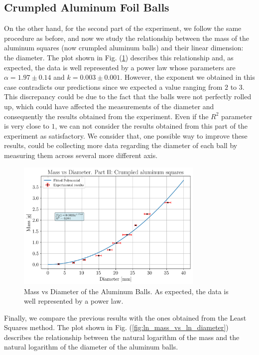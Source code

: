 \documentclass[a4paper,12pt]{article}
\begin{document}
\subsection{Crumpled Aluminum Foil Balls}
On the other hand, for the second part of the experiment, we follow the same procedure as before, and now we study the relationship between the mass 
of the aluminum squares (now crumpled aluminum balls) and their linear dimension: the diameter. The plot shown in Fig. (\ref{fig:mass_vs_diameter}) 
describes this relationship and, as expected, the data is well represented by a power law whose parameters are $\alpha = 1.97 \pm 0.14$ and $k = 0.003 \pm 0.001$. 
However, the exponent we obtained in this case contradicts our predictions since we expected a value ranging from $2$ to $3$. This discrepancy could be due to the fact 
that the balls were not perfectly rolled up, which could have affected the measurements of the diameter and consequently the results obtained from the experiment. Even if the $R^2$ parameter is very close to $1$, 
we can not consider the results obtained from this part of the experiment as satisfactory. 
We consider that, one possible way to improve these results, could be collecting more data regarding the diameter of each ball by measuring them across several more different axis. 

\begin{figure}[h!]
    \centering
    \includegraphics[width = 0.8\textwidth]{mass_vs_diameter.png}
    \caption{Mass vs Diameter of the Aluminum Balls. As expected, the data is well represented by a power law.}
    \label{fig:mass_vs_diameter}
\end{figure}

Finally, we compare the previous results with the ones obtained from the Least Squares method. The plot shown in Fig. (\ref{fig:ln_mass_vs_ln_diameter}) describes the relationship between the natural logarithm of the mass and the natural logarithm of the diameter of the aluminum balls.
\end{document}
